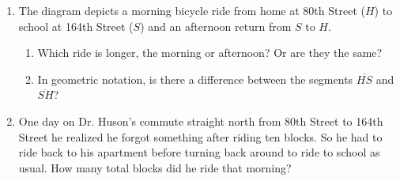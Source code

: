 \begin{enumerate}
\item The diagram depicts a morning bicycle ride from home at 80th Street ($H$) to school at 164th Street ($S$) and an afternoon return from $S$ to $H$. \par \smallskip
    \begin{enumerate}[itemsep=1cm]
        \item Which ride is longer, the morning or afternoon? Or are they the same?
        \item In geometric notation, is there a difference between the segments $\overline{HS}$ and $\overline{SH}$?
    \end{enumerate} \vspace{1cm}

\item One day on Dr. Huson's commute straight north from 80th Street to 164th Street he realized he forgot something after riding ten blocks. So he had to ride back to his apartment before turning back around to ride to school as usual. How many total blocks did he ride that morning?


\end{enumerate}

